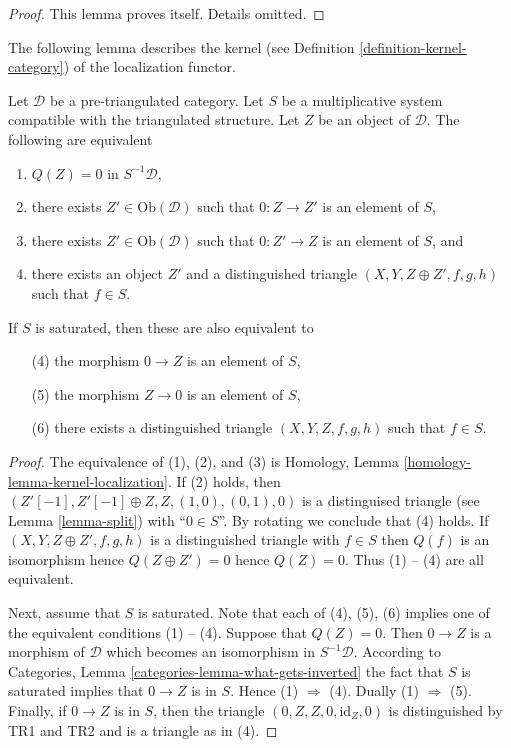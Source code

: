 \begin{proof}
This lemma proves itself. Details omitted.
\end{proof}

\noindent
The following lemma describes the kernel (see
Definition \ref{definition-kernel-category})
of the localization functor.

\begin{lemma}
\label{lemma-kernel-localization}
Let $\mathcal{D}$ be a pre-triangulated category. Let $S$ be a multiplicative
system compatible with the triangulated structure. Let $Z$ be an object
of $\mathcal{D}$. The following are equivalent
\begin{enumerate}
\item $Q(Z) = 0$ in $S^{-1}\mathcal{D}$,
\item there exists $Z' \in \text{Ob}(\mathcal{D})$ such that
$0 : Z \to Z'$ is an element of $S$,
\item there exists $Z' \in \text{Ob}(\mathcal{D})$ such that
$0 : Z' \to Z$ is an element of $S$, and
\item there exists an object $Z'$ and a distinguished triangle
$(X, Y, Z \oplus Z', f, g, h)$ such that $f \in S$.
\end{enumerate}
If $S$ is saturated, then these are also equivalent to
\begin{enumerate}
\item[(4)] the morphism $0 \to Z$ is an element of $S$,
\item[(5)] the morphism $Z \to 0$ is an element of $S$,
\item[(6)] there exists a distinguished triangle $(X, Y, Z, f, g, h)$
such that $f \in S$.
\end{enumerate}
\end{lemma}

\begin{proof}
The equivalence of (1), (2), and (3) is
Homology, Lemma \ref{homology-lemma-kernel-localization}.
If (2) holds, then $(Z'[-1], Z'[-1] \oplus Z, Z, (1, 0), (0, 1), 0)$
is a distinguised triangle (see
Lemma \ref{lemma-split})
with ``$0 \in S$''. By rotating we conclude that (4) holds.
If $(X, Y, Z \oplus Z', f, g, h)$ is a distinguished triangle with $f \in S$
then $Q(f)$ is an isomorphism hence $Q(Z \oplus Z') = 0$ hence $Q(Z) = 0$.
Thus (1) -- (4) are all equivalent.

\medskip\noindent
Next, assume that $S$ is saturated. Note that each of (4), (5), (6)
implies one of the equivalent conditions (1) -- (4). Suppose that
$Q(Z) = 0$. Then $0 \to Z$ is a morphism of $\mathcal{D}$ which becomes
an isomorphism in $S^{-1}\mathcal{D}$. According to
Categories, Lemma \ref{categories-lemma-what-gets-inverted}
the fact that $S$ is saturated implies that $0 \to Z$ is in $S$.
Hence (1) $\Rightarrow$ (4). Dually (1) $\Rightarrow$ (5).
Finally, if $0 \to Z$ is in $S$, then the triangle
$(0, Z, Z, 0, \text{id}_Z, 0)$ is distinguished by TR1 and TR2 and
is a triangle as in (4).
\end{proof}

